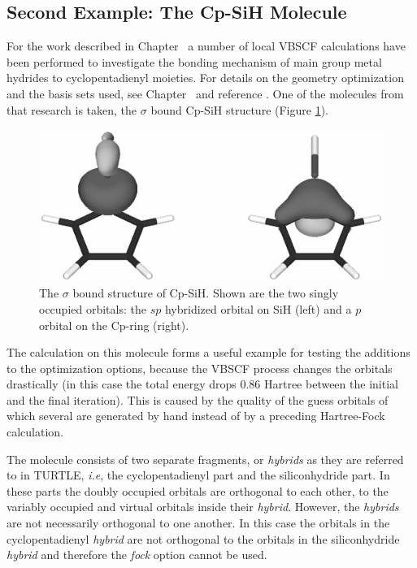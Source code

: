 \subsection{\label{ch2.sec.cyclopent}Second Example: The Cp-SiH Molecule}

For the work described in Chapter \chcyclopentadienyl\, a number of local VBSCF calculations have been performed to investigate the bonding mechanism of main group metal hydrides to cyclopentadienyl moieties. For details on the geometry optimization and the basis sets used, see Chapter \chcyclopentadienyl\ and reference \cite{budzelaar}. One of the molecules from that research is taken, the $\sigma$ bound \mbox{Cp-SiH} structure (Figure \ref{fig.cpsih}).
\begin{figure}[htdp]
\center
\includegraphics[scale=0.6]{orbopt/figures/sigma_sih.eps}
\caption{The $\sigma$ bound structure of Cp-SiH. Shown are the two singly occupied orbitals: the $sp$ hybridized orbital on SiH (left) and a $p$ orbital on the Cp-ring (right).}
\label{fig.cpsih}
\end{figure}
The calculation on this molecule forms a useful example for testing the additions to the optimization options, because the VBSCF process changes the orbitals drastically (in this case the total energy drops 0.86 Hartree between the initial and the final iteration). This is caused by the quality of the guess orbitals of which several are generated by hand instead of by a preceding Hartree-Fock calculation.

The molecule consists of two separate fragments, or \textit{hybrids} as they are referred to in TURTLE, \textit{i.e}, the cyclopentadienyl part and the siliconhydride part. In these parts the doubly occupied orbitals are orthogonal to each other, to the variably occupied and virtual orbitals inside their \textit{hybrid}. However, the \textit{hybrids} are not necessarily orthogonal to one another. In this case the orbitals in the cyclopentadienyl \textit{hybrid} are not orthogonal to the orbitals in the siliconhydride \textit{hybrid} and therefore the \textit{fock} option cannot be used.

